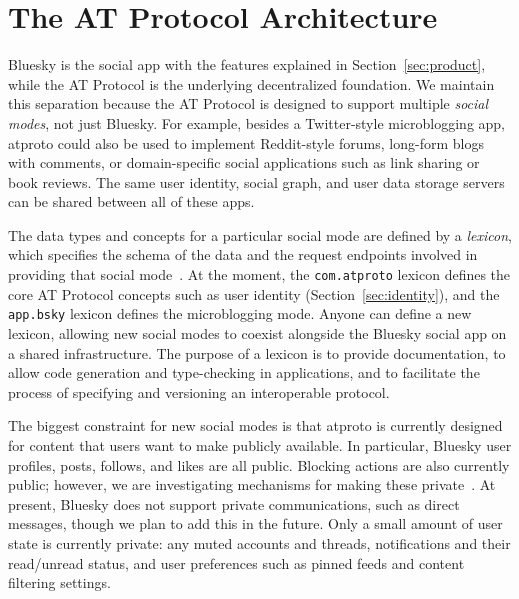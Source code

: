 \documentclass[sigconf,nonacm]{acmart}
\begin{document}
\section{The AT Protocol Architecture}\label{sec:architecture}

Bluesky is the social app with the features explained in Section~\ref{sec:product}, while the AT Protocol is the underlying decentralized foundation.
We maintain this separation because the AT Protocol is designed to support multiple \emph{social modes}, not just Bluesky.
For example, besides a Twitter-style microblogging app, atproto could also be used to implement Reddit-style forums, long-form blogs with comments, or domain-specific social applications such as link sharing or book reviews.
The same user identity, social graph, and user data storage servers can be shared between all of these apps.

The data types and concepts for a particular social mode are defined by a \emph{lexicon}, which specifies the schema of the data and the request endpoints involved in providing that social mode~\cite{AtProtoSpecs}.
At the moment, the \texttt{com.atproto} lexicon defines the core AT Protocol concepts such as user identity (Section~\ref{sec:identity}), and the \texttt{app.bsky} lexicon defines the microblogging mode.
Anyone can define a new lexicon, allowing new social modes to coexist alongside the Bluesky social app on a shared infrastructure.
The purpose of a lexicon is to provide documentation, to allow code generation and type-checking in applications, and to facilitate the process of specifying and versioning an interoperable protocol.

The biggest constraint for new social modes is that atproto is currently designed for content that users want to make publicly available.
In particular, Bluesky user profiles, posts, follows, and likes are all public.
Blocking actions are also currently public; however, we are investigating mechanisms for making these private~\cite{PublicBlocks,PrivateBlocks}.
At present, Bluesky does not support private communications, such as direct messages, though we plan to add this in the future.
Only a small amount of user state is currently private: any muted accounts and threads, notifications and their read/unread status, and user preferences such as pinned feeds and content filtering settings.
\end{document}
